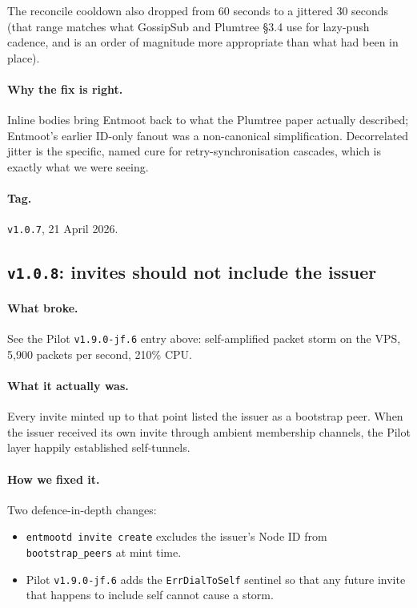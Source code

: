 \documentclass[11pt,a4paper]{article}
\begin{document}
The reconcile cooldown also dropped from 60 seconds to a
jittered 30 seconds (that range matches what GossipSub and
Plumtree \S3.4 use for lazy-push cadence, and is an order of
magnitude more appropriate than what had been in place).

\paragraph{Why the fix is right.} Inline bodies bring Entmoot
back to what the Plumtree paper actually described; Entmoot's
earlier ID-only fanout was a non-canonical simplification.
Decorrelated jitter is the specific, named cure for
retry-synchronisation cascades, which is exactly what we were
seeing.

\paragraph*{Tag.} \texttt{v1.0.7}, 21 April 2026.

\subsection{\texttt{v1.0.8}: invites should not include the
issuer}

\paragraph{What broke.} See the Pilot
\texttt{v1.9.0-jf.6} entry above: self-amplified packet storm
on the VPS, 5,900 packets per second, 210\% CPU.

\paragraph{What it actually was.} Every invite minted up to
that point listed the issuer as a bootstrap peer. When the
issuer received its own invite through ambient membership
channels, the Pilot layer happily established self-tunnels.

\paragraph{How we fixed it.} Two defence-in-depth changes:

\begin{itemize}[leftmargin=1.2em]
    \item \texttt{entmootd invite create} excludes the issuer's
    Node ID from \texttt{bootstrap\_peers} at mint time.
    \item Pilot \texttt{v1.9.0-jf.6} adds the
    \texttt{ErrDialToSelf} sentinel so that any future invite
    that happens to include self cannot cause a storm.
\end{itemize}
\end{document}
